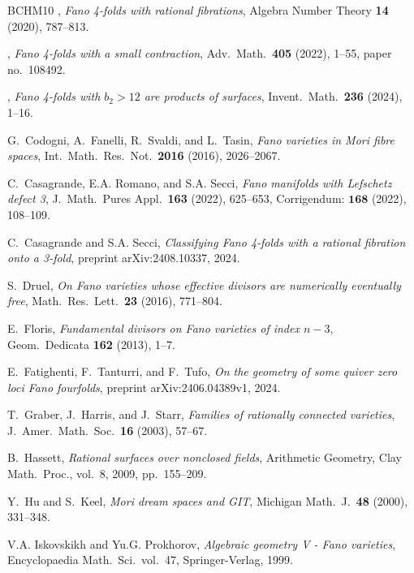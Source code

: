 \documentclass[a4paper,12pt]{amsart}
\theoremstyle{definition}
\numberwithin{figure}{section}
\numberwithin{table}{section}
\begin{document}
\begin{thebibliography}{BCHM10}
\bysame, \emph{Fano 4-folds with rational fibrations}, Algebra Number Theory
  \textbf{14} (2020), 787--813.

\bysame, \emph{Fano 4-folds with a small contraction}, Adv.\ Math.\
  \textbf{405} (2022), 1--55, paper no.\ 108492.

\bysame, \emph{{F}ano 4-folds with {$b_2>12$} are products of surfaces},
  Invent.\ Math.\ \textbf{236} (2024), 1--16.

G.~Codogni, A.~Fanelli, R.~Svaldi, and L.~Tasin, \emph{{F}ano varieties in
  {M}ori fibre spaces}, Int.\ Math.\ Res.\ Not.\ \textbf{2016} (2016),
  2026--2067.

C.~Casagrande, E.A. Romano, and S.A. Secci, \emph{Fano manifolds with
  {L}efschetz defect 3}, J.\ Math.\ Pures Appl.\ \textbf{163} (2022), 625--653,
  Corrigendum: {$\mathbf{168}$} (2022), 108--109.

C.~Casagrande and S.A. Secci, \emph{Classifying {F}ano 4-folds with a rational
  fibration onto a 3-fold}, preprint arXiv:2408.10337, 2024.

S.~Druel, \emph{On {F}ano varieties whose effective divisors are numerically
  eventually free}, Math.\ Res.\ Lett.\ \textbf{23} (2016), 771--804.

E.~Floris, \emph{Fundamental divisors on {F}ano varieties of index {$n-3$}},
  Geom.\ Dedicata \textbf{162} (2013), 1--7.

E.~Fatighenti, F.~Tanturri, and F.~Tufo, \emph{On the geometry of some quiver
  zero loci {F}ano fourfolds}, preprint arXiv:2406.04389v1, 2024.

T.~Graber, J.~Harris, and J.~Starr, \emph{Families of rationally connected
  varieties}, J.\ Amer.\ Math.\ Soc.\ \textbf{16} (2003), 57--67.

B.~Hassett, \emph{Rational surfaces over nonclosed fields}, Arithmetic
  Geometry, Clay Math.~Proc., vol.~8, 2009, pp.~155--209.

Y.~Hu and S.~Keel, \emph{Mori dream spaces and {GIT}}, Michigan Math.\ J.\
  \textbf{48} (2000), 331--348.

V.A. Iskovskikh and Yu.G. Prokhorov, \emph{Algebraic geometry {V} - {F}ano
  varieties}, Encyclopaedia Math.\ Sci.\, vol.~47, Springer-Verlag, 1999.


\end{thebibliography}
\end{document}
